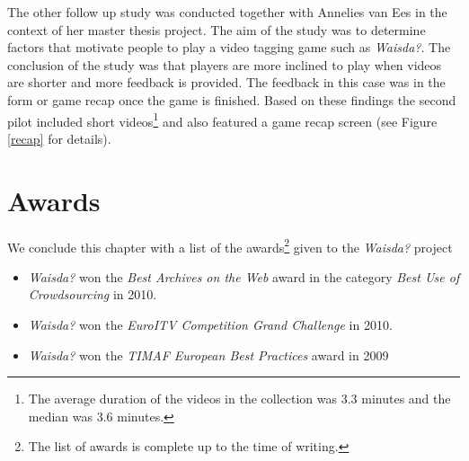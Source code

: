 The other follow up study \cite{Annelies} was conducted together with Annelies van Ees in the context of her master thesis project. The aim of the study was to determine factors that motivate people to play a video tagging game such as \textit{Waisda?}. The conclusion of the study was that players are more inclined to play when videos are shorter and more feedback is provided. The feedback in this case was in the form or game recap once the game is finished. Based on these findings the second pilot included short videos\footnote{The average duration of the videos in the collection was $3.3$ minutes and the median was $3.6$ minutes.} and also featured a game recap screen (see Figure \ref{recap} for details).  

\section{Awards}
We conclude this chapter with a list of the awards\footnote{The list of awards is complete up to the time of writing.} given to the \textit{Waisda?} project 
\begin{itemize}
\item \textit{Waisda?} won the \textit{Best Archives on the Web} award in the category \textit{Best Use of Crowdsourcing} in 2010.
\item \textit{Waisda?} won the \textit{EuroITV Competition Grand Challenge} in 2010.
\item \textit{Waisda?} won the \textit{TIMAF European Best Practices} award in 2009
\end{itemize}